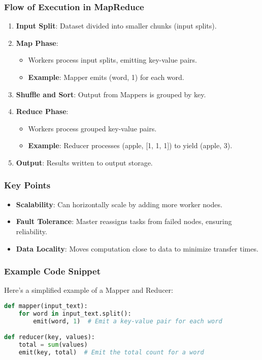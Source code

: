 \documentclass[aspectratio=169]{beamer}
\begin{document}
\begin{frame}[fragile]
    \frametitle{Flow of Execution in MapReduce}
    \begin{enumerate}
        \item \textbf{Input Split}: Dataset divided into smaller chunks (input splits).
        \item \textbf{Map Phase}:
        \begin{itemize}
            \item Workers process input splits, emitting key-value pairs.
            \item \textbf{Example}: Mapper emits (word, 1) for each word.
        \end{itemize}
        \item \textbf{Shuffle and Sort}: Output from Mappers is grouped by key.
        \item \textbf{Reduce Phase}:
        \begin{itemize}
            \item Workers process grouped key-value pairs.
            \item \textbf{Example}: Reducer processes (apple, [1, 1, 1]) to yield (apple, 3).
        \end{itemize}
        \item \textbf{Output}: Results written to output storage.
    \end{enumerate}
\end{frame}

\begin{frame}[fragile]
    \frametitle{Key Points}
    \begin{itemize}
        \item \textbf{Scalability}: Can horizontally scale by adding more worker nodes.
        \item \textbf{Fault Tolerance}: Master reassigns tasks from failed nodes, ensuring reliability.
        \item \textbf{Data Locality}: Moves computation close to data to minimize transfer times.
    \end{itemize}
\end{frame}

\begin{frame}[fragile]
    \frametitle{Example Code Snippet}
    Here's a simplified example of a Mapper and Reducer:

    \begin{lstlisting}[language=Python]
def mapper(input_text):
    for word in input_text.split():
        emit(word, 1)  # Emit a key-value pair for each word

def reducer(key, values):
    total = sum(values)
    emit(key, total)  # Emit the total count for a word
    \end{lstlisting}
\end{frame}
\end{document}
